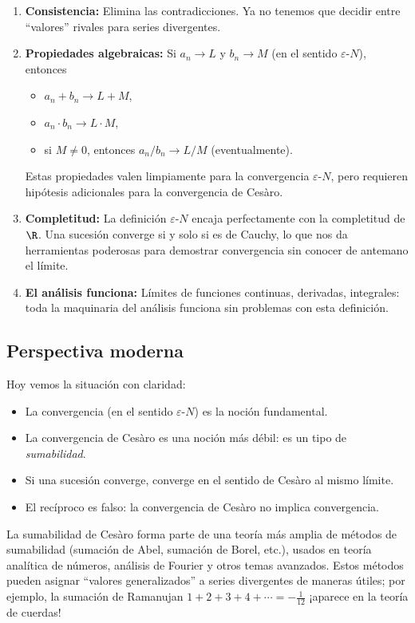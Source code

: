 \begin{enumerate}
  \item \textbf{Consistencia:} Elimina las contradicciones. Ya no tenemos que decidir entre ``valores'' rivales para series divergentes.
  \item \textbf{Propiedades algebraicas:} Si $a_n \to L$ y $b_n \to M$ (en el sentido $\varepsilon$-$N$), entonces
  \begin{itemize}
    \item $a_n + b_n \to L + M$,
    \item $a_n \cdot b_n \to L \cdot M$,
    \item si $M \ne 0$, entonces $a_n / b_n \to L/M$ (eventualmente).
  \end{itemize}
  Estas propiedades valen limpiamente para la convergencia $\varepsilon$-$N$, pero requieren hipótesis adicionales para la convergencia de Cesàro.
  \item \textbf{Completitud:} La definición $\varepsilon$-$N$ encaja perfectamente con la completitud de $\R$. Una sucesión converge si y solo si es de Cauchy, lo que nos da herramientas poderosas para demostrar convergencia sin conocer de antemano el límite.
  \item \textbf{El análisis funciona:} Límites de funciones continuas, derivadas, integrales: toda la maquinaria del análisis funciona sin problemas con esta definición.
\end{enumerate}

\subsection{Perspectiva moderna}

Hoy vemos la situación con claridad:
\begin{itemize}
  \item La convergencia (en el sentido $\varepsilon$-$N$) es la noción fundamental.
  \item La convergencia de Cesàro es una noción más débil: es un tipo de \emph{sumabilidad}.
  \item Si una sucesión converge, converge en el sentido de Cesàro al mismo límite.
  \item El recíproco es falso: la convergencia de Cesàro no implica convergencia.
\end{itemize}

La sumabilidad de Cesàro forma parte de una teoría más amplia de métodos de sumabilidad (sumación de Abel, sumación de Borel, etc.), usados en teoría analítica de números, análisis de Fourier y otros temas avanzados. Estos métodos pueden asignar ``valores generalizados'' a series divergentes de maneras útiles; por ejemplo, la sumación de Ramanujan $1 + 2 + 3 + 4 + \cdots = -\frac{1}{12}$ ¡aparece en la teoría de cuerdas!

